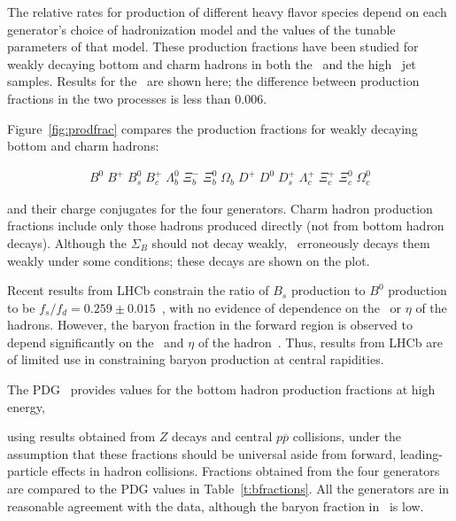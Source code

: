 
The relative rates for production of different heavy flavor species depend on each
generator's choice of hadronization model and the values of the tunable parameters of that model.
These production fractions have been studied for weakly decaying bottom and charm hadrons in both the \ttbar\
and the high \pT\ jet samples. Results for the \ttbar\ are shown here; the difference between
production fractions in the two processes is less than  0.006.

Figure~\ref{fig:prodfrac} compares the
production fractions for weakly decaying bottom and charm hadrons:

\begin{eqnarray*}
B^{0}\; B^{+}\; B_{s}^{0}\; B_{c}^{+}\; \Lambda_{b}^{0}\; \Xi_{b}^{-}\; \Xi_{b}^{0}\; \Omega_{b}\; D^{+}\; D^{0}\; D_{s}^{+}\; \Lambda_{c}^{+}\; \Xi_{c}^{+}\; \Xi_{c}^{0}\; \Omega_{c}^{0}
\end{eqnarray*} 

\noindent
and their charge conjugates for the four generators.
Charm hadron production fractions include only those hadrons produced directly (not from bottom hadron decays).
Although the $\Sigma_B$ should not decay weakly, 
\Herwig\ erroneously decays them weakly under some conditions; these decays are shown on the plot. 

Recent results from LHCb constrain the ratio of $B_s$ production to $B^0$ production to be
$f_s/f_d = 0.259 \pm 0.015$~\cite{lhcb,fsfb}, with no evidence of dependence 
on the \pT\ or $\eta$ of the hadrons.
However, the baryon fraction in the forward region is observed to depend significantly on the  
\pT\ and $\eta$ of the hadron~\cite{lhcb,lam}.  Thus, results from LHCb are of limited use in
constraining baryon production at central rapidities. 

The PDG~\cite{PhysRevD.86.010001} provides values for the bottom hadron production fractions at high energy, 

using results obtained from  $Z$ decays and central $p\overline p $ collisions, under the
assumption that these fractions should be universal aside from forward, leading-particle effects
in hadron collisions.
Fractions obtained from the four generators are compared to the PDG values
in Table~\ref{t:bfractions}.
All the generators are in reasonable agreement with the data, although the baryon
fraction in  \PythiaE\ is low.  

